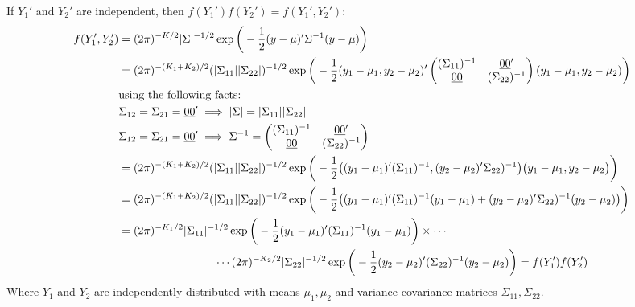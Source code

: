 \documentclass{article}[12pt]
\begin{document}
\begin{enumerate}
		If $Y_1'$  and $Y_2'$ are independent, then $f(Y_1')f(Y_2') = f(Y_1',Y_2')$:
		\begin{align*}
			f(Y_1',Y_2') &= (2\pi)^{-K/2} |\Sigma|^{-1/2} \exp \bigg( -\frac{1}{2} (y - \mu)' \Sigma^{-1} (y - \mu) \bigg)\\
			&= (2\pi)^{-(K_1+K_2)/2} (|\Sigma_{11}||\Sigma_{22}|)^{-1/2} \exp \bigg(-\frac{1}{2} (y_1-\mu_1, y_2 - \mu_2)' \begin{pmatrix} (\Sigma_{11})^{-1} & \underline{00}' \\ \underline{00} & (\Sigma_{22})^{-1} \\ \end{pmatrix} (y_1-\mu_1, y_2 - \mu_2) \bigg) \\
				& \mbox{using the following facts:}\\
				& \Sigma_{12} = \Sigma_{21} = \underline{00}' \implies |\Sigma|=|\Sigma_{11}| |\Sigma_{22}| \\
				& \Sigma_{12} = \Sigma_{21} = \underline{00}' \implies \Sigma^{-1} =
					\begin{pmatrix}
						(\Sigma_{11})^{-1} & \underline{00}' \\
						\underline{00} & (\Sigma_{22})^{-1} \\
					\end{pmatrix}\\
			&= (2\pi)^{-(K_1+K_2)/2} (|\Sigma_{11}||\Sigma_{22}|)^{-1/2} \exp \bigg(-\frac{1}{2} \big((y_1-\mu_1)'(\Sigma_{11})^{-1}, (y_2 - \mu_2)' \Sigma_{22})^{-1} \big) \big(y_1-\mu_1, y_2 - \mu_2\big) \bigg) \\
			&= (2\pi)^{-(K_1+K_2)/2} (|\Sigma_{11}||\Sigma_{22}|)^{-1/2} \exp \bigg(-\frac{1}{2} \big((y_1-\mu_1)'(\Sigma_{11})^{-1}(y_1-\mu_1) + (y_2 - \mu_2)' \Sigma_{22})^{-1} (y_2 - \mu_2) \big) \bigg) \\
			&= (2\pi)^{-K_1/2} |\Sigma_{11}|^{-1/2} \exp \bigg(-\frac{1}{2} (y_1-\mu_1)'(\Sigma_{11})^{-1}(y_1-\mu_1) \bigg) \times \cdots \\
				& \mbox{\hspace{3cm}} \cdots (2\pi)^{-K_2/2} |\Sigma_{22}|^{-1/2} \exp \bigg(-\frac{1}{2} (y_2 - \mu_2)' (\Sigma_{22})^{-1} (y_2 - \mu_2) \bigg) = f(Y_1')f(Y_2')
		\end{align*}
		Where $Y_1$ and $Y_2$ are independently distributed with means $\mu_1, \mu_2$ and variance-covariance matrices $\Sigma_{11}, \Sigma_{22}$.


\end{enumerate}
\end{document}
